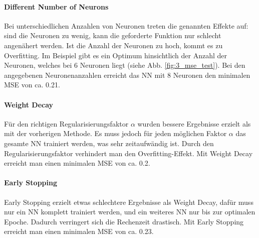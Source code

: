 \paragraph{Different Number of Neurons}

Bei unterschiedlichen Anzahlen von Neuronen treten die genannten Effekte auf: sind die Neuronen zu wenig, kann die geforderte Funktion nur schlecht angenähert werden. Ist die Anzahl der Neuronen zu hoch, kommt es zu Overfitting. Im Beispiel gibt es ein Optimum hinsichtlich der Anzahl der Neuronen, welches bei 6 Neuronen liegt (siehe Abb. \ref{fig:3_mse_test}). Bei den angegebenen Neuronenanzahlen erreicht das NN mit 8 Neuronen den minimalen MSE von ca. 0.21.

\paragraph{Weight Decay}

Für den richtigen Regularisierungsfaktor $\alpha$ wurden bessere Ergebnisse erzielt als mit der vorherigen Methode. Es muss jedoch für jeden möglichen Faktor $\alpha$ das gesamte NN trainiert werden, was sehr zeitaufwändig ist. Durch den Regularisierungsfaktor verhindert man den Overfitting-Effekt. Mit Weight Decay erreicht man einen minimalen MSE von ca. 0.2.

\paragraph{Early Stopping}

Early Stopping erzielt etwas schlechtere Ergebnisse als Weight Decay, dafür muss nur ein NN komplett trainiert werden, und ein weiteres NN nur bis zur optimalen Epoche. Dadurch verringert sich die Rechenzeit drastisch. Mit Early Stopping erreicht man einen minimalen MSE von ca. 0.23.

